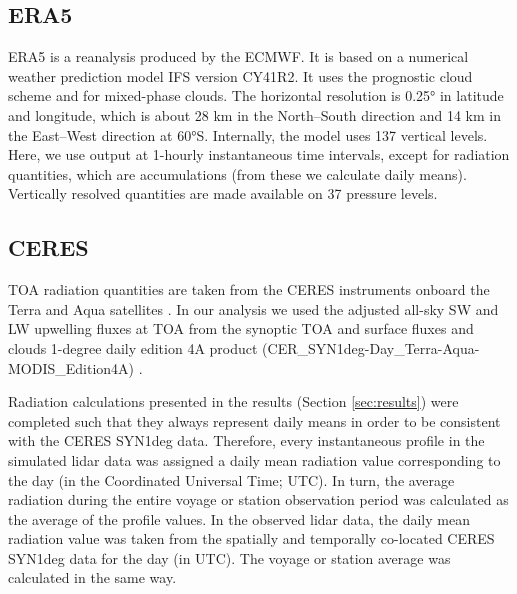 \documentclass[draft]{agujournal2019}
\begin{document}
\subsection{ERA5}

ERA5 \cite{era5} is a reanalysis produced by the ECMWF. It is based on a numerical weather prediction model IFS version CY41R2. It uses the  prognostic cloud scheme and  for mixed-phase clouds. The horizontal resolution is 0.25° in latitude and longitude, which is about 28 km in the North--South direction and 14 km in the East--West direction at 60°S. Internally, the model uses 137 vertical levels. Here, we use output at 1-hourly instantaneous time intervals, except for radiation quantities, which are accumulations (from these we calculate daily means). Vertically resolved quantities are made available on 37 pressure levels.

\subsection{CERES}

TOA radiation quantities are taken from the CERES instruments onboard the Terra and Aqua satellites \cite{wielicki1996,loeb2018}. In our analysis we used the adjusted all-sky SW and LW upwelling fluxes at TOA from the synoptic TOA and surface fluxes and clouds 1-degree daily edition 4A product (CER\_SYN1deg-Day\_Terra-Aqua-MODIS\_Edition4A) \cite{doelling2013,doelling2016}.

Radiation calculations presented in the results (Section \ref{sec:results}) were completed such that they always represent daily means in order to be consistent with the CERES SYN1deg data. Therefore, every instantaneous profile in the simulated lidar data was assigned a daily mean radiation value corresponding to the day (in the Coordinated Universal Time; UTC). In turn, the average radiation during the entire voyage or station observation period was calculated as the average of the profile values. In the observed lidar data, the daily mean radiation value was taken from the spatially and temporally co-located CERES SYN1deg data for the day (in UTC). The voyage or station average was calculated in the same way.
\end{document}
